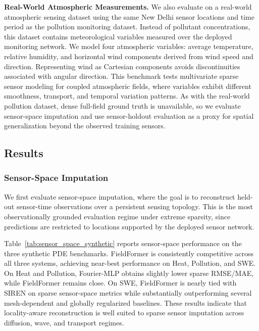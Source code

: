 \noindent\textbf{Real-World Atmospheric Measurements.}
We also evaluate on a real-world atmospheric sensing dataset using the same New Delhi sensor locations and time period as the pollution monitoring dataset. Instead of pollutant concentrations, this dataset contains meteorological variables measured over the deployed monitoring network. We model four atmospheric variables: average temperature, relative humidity, and horizontal wind components derived from wind speed and direction. Representing wind as Cartesian components avoids discontinuities associated with angular direction. This benchmark tests multivariate sparse sensor modeling for coupled atmospheric fields, where variables exhibit different smoothness, transport, and temporal variation patterns. As with the real-world pollution dataset, dense full-field ground truth is unavailable, so we evaluate sensor-space imputation and use sensor-holdout evaluation as a proxy for spatial generalization beyond the observed training sensors.


\subsection{Results}
\label{sec:results}

\subsubsection{Sensor-Space Imputation}
\label{sec:sensor_space_results}

We first evaluate sensor-space imputation, where the goal is to reconstruct held-out sensor-time observations over a persistent sensing topology. This is the most observationally grounded evaluation regime under extreme sparsity, since predictions are restricted to locations supported by the deployed sensor network.

Table~\ref{tab:sensor_space_synthetic} reports sensor-space performance on the three synthetic PDE benchmarks. FieldFormer is consistently competitive across all three systems, achieving near-best performance on Heat, Pollution, and SWE. On Heat and Pollution, Fourier-MLP obtains slightly lower sparse RMSE/MAE, while FieldFormer remains close. On SWE, FieldFormer is nearly tied with SIREN on sparse sensor-space metrics while substantially outperforming several mesh-dependent and globally regularized baselines. These results indicate that locality-aware reconstruction is well suited to sparse sensor imputation across diffusion, wave, and transport regimes.

